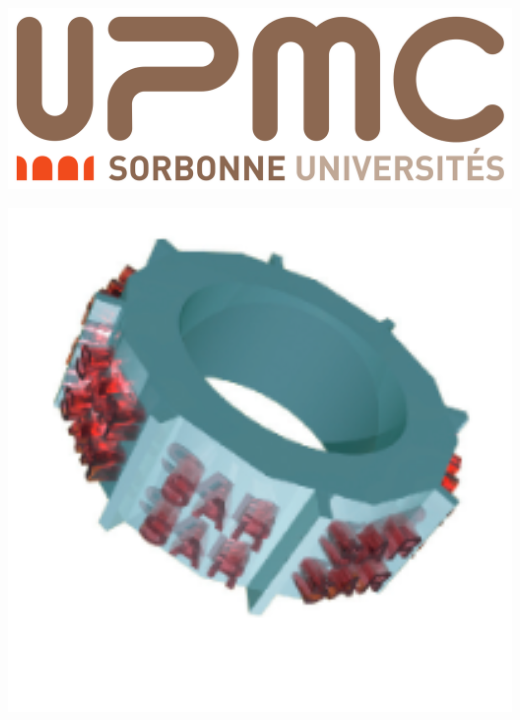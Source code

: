 \documentclass[10pt]{report}
\begin{document}
\begin{mdframed}[backgroundcolor=white!20] 
\begin{minipage}{0.48\textwidth} \begin{flushleft}
\includegraphics[scale = 0.08]{imgs/upmc.png}
\end{flushleft}\end{minipage}
\begin{minipage}{0.48\textwidth} \begin{flushright}
\includegraphics[scale = 0.08]{imgs/sar.png}
\end{flushright}\end{minipage}
	\maketitle
\end{mdframed}
\end{document}
